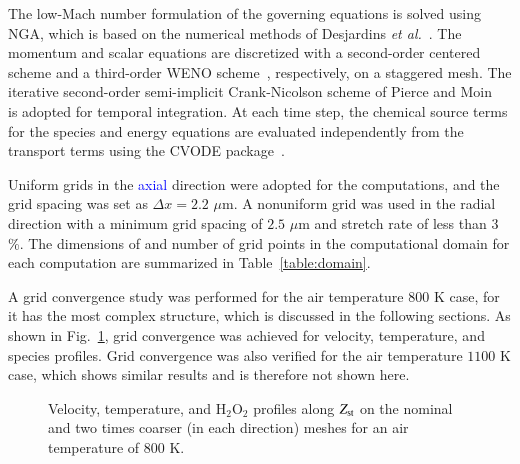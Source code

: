 \documentclass[review,3p,times]{elsarticle}
\begin{document}
The low-Mach number formulation of the governing equations is solved using NGA, which is based on the numerical methods of Desjardins \emph{et al.}~\cite{desjardins08}.  The momentum and scalar equations are discretized with a second-order centered scheme and a third-order WENO scheme~\cite{liu94}, respectively, on a staggered mesh.  The iterative second-order semi-implicit Crank-Nicolson scheme of Pierce and Moin~\cite{pierce01} is adopted for temporal integration.  At each time step, the chemical source terms for the species and energy equations are evaluated independently from the transport terms using the CVODE package~\cite{cohen96}.

Uniform grids in the \textcolor{blue}{axial} direction were adopted for the computations, and the grid spacing was set as $\Delta x = 2.2$ $\mu$m.  A nonuniform grid was used in the radial direction with a minimum grid spacing of $2.5$ $\mu$m and stretch rate of less than $3$\%.  The dimensions of and number of grid points in the computational domain for each computation are summarized in Table~\ref{table:domain}.

\begin{table}
  \caption{Computational domain and number of grid points.}
  \label{table:domain}
  \centering
  \normalsize
\end{table}

A grid convergence study was performed for the air temperature $800$ K case, for it has the most complex structure, which is discussed in the following sections.  As shown in Fig.~\ref{fig:convergence}, grid convergence was achieved for velocity, temperature, and species profiles.  Grid convergence was also verified for the air temperature $1100$ K case, which shows similar results and is therefore not shown here.  

\begin{figure}
  \centering
  \scriptsize
  \hspace{-0.40625in}
  
  \hspace{-0.40625in}
  
  \hspace{-0.40625in}
  
  \normalsize
  \caption{Velocity, temperature, and H$_2$O$_2$ profiles along $Z_{\rm st}$ on the nominal and two times coarser (in each direction) meshes for an air temperature of $800$ K.}
  \label{fig:convergence}
\end{figure}
\end{document}
